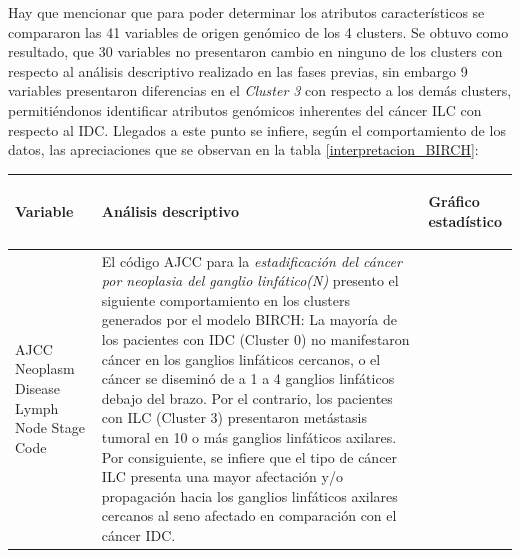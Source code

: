 Hay que mencionar que para poder determinar los atributos característicos se compararon las 41 variables de origen genómico de los 4 clusters. Se obtuvo como resultado, que 30 variables no presentaron cambio en ninguno de los clusters con respecto al análisis descriptivo realizado en las fases previas, sin embargo 9 variables presentaron diferencias en el \textit{Cluster 3} con respecto a los demás clusters, permitiéndonos identificar atributos genómicos inherentes del cáncer ILC con respecto al IDC. Llegados a este punto se infiere, según el comportamiento de los datos, las apreciaciones que se observan en la tabla \ref{interpretacion_BIRCH}:
\begin{table}[htb!]
	\footnotesize
	\begin{threeparttable}
		\begin{tabular}{p{2.5cm} p{7cm} p{6.5cm}} \toprule
			\begin{center}Variable\end{center}   	 
			&\begin{center}Análisis descriptivo\end{center}             
			&\begin{center}Gráfico estadístico\end{center}\\ \hline
			AJCC Neoplasm Disease Lymph Node Stage Code
			&  El código AJCC para la \textit{estadificación del cáncer por neoplasia del ganglio linfático(N)} presento el siguiente comportamiento en los clusters generados por el modelo BIRCH: La mayoría de los pacientes con IDC (Cluster 0) no manifestaron cáncer en los ganglios linfáticos cercanos, o el cáncer se diseminó de a 1 a 4 ganglios linfáticos debajo del brazo. Por el contrario, los pacientes con ILC (Cluster 3) presentaron metástasis tumoral en 10 o más ganglios linfáticos axilares. Por consiguiente, se infiere que el tipo de cáncer ILC presenta una mayor afectación y/o propagación hacia los ganglios linfáticos axilares cercanos al seno afectado en comparación con el cáncer IDC.
			

\end{tabular}
\end{threeparttable}
\end{table}
